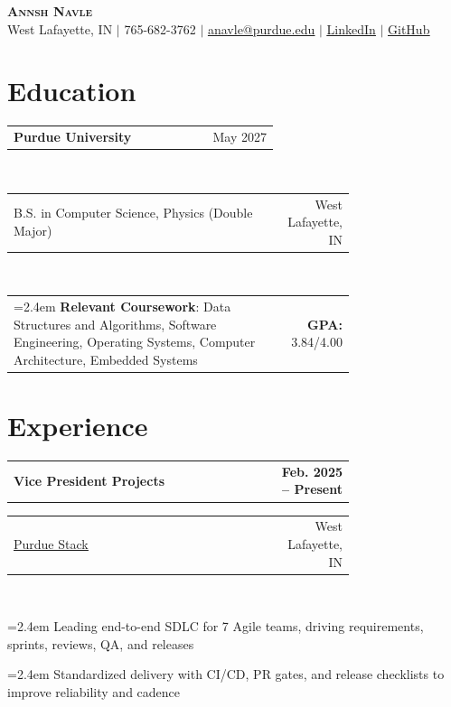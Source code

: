 \documentclass[letterpaper,11pt]{article}
\makeatletter
\newcommand{\LeftRight}[2]{%
  \begin{tabular*}{\linewidth}{@{\extracolsep{\fill}} p{0.75\linewidth} r}
    #1 & #2 \\
  \end{tabular*}
}
\newcommand{\Bitem}[1]{%
  \par\hangindent=2.4em\hangafter=1
  \noindent\hspace{1em}%
  \makebox[1.4em][l]{\raisebox{0.2ex}{\scriptsize$\bullet$}}#1\\[-2pt]%
}
\newcommand{\BitemEd}[1]{%
  \hangindent=2.4em\hangafter=1
  \hspace{1em}%
  \makebox[1.4em][l]{\raisebox{0.2ex}{\scriptsize$\bullet$}}%
  #1%
}
\makeatother
\begin{document}

\begin{center}
    \textbf{\Huge \scshape Annsh Navle} \\ \vspace{1pt}
    \small West Lafayette, IN $|$ 
    \small 765-682-3762 $|$ 
    \href{mailto:anavle@purdue.edu}{\underline{anavle@purdue.edu}} $|$
    \href{https://linkedin.com/in/annsh-navle}{\underline{LinkedIn}} $|$
    \href{https://github.com/Annsh-N}{\underline{GitHub}}
\end{center}


\section{Education}
      \LeftRight{\textbf{Purdue University}}{May 2027} \\
      \LeftRight{B.S. in Computer Science, Physics (Double Major)}{West Lafayette, IN} \\
      \LeftRight{\BitemEd{\textbf{Relevant Coursework}: Data Structures and Algorithms, Software Engineering, Operating Systems, Computer Architecture, Embedded Systems}}{\textbf{GPA:} 3.84/4.00}
      \vspace{-6pt}

\section{Experience}

      \LeftRight{\textbf{Vice President Projects}}{\textbf{Feb. 2025 -- Present}}
      \LeftRight{\href{https://www.purduestack.org/}{\underline{Purdue Stack}}}{West Lafayette, IN} \\
        \Bitem{Leading end-to-end SDLC for 7 Agile teams, driving requirements, sprints, reviews, QA, and releases}
        \Bitem{Standardized delivery with CI/CD, PR gates, and release checklists to improve reliability and cadence}
\end{document}
